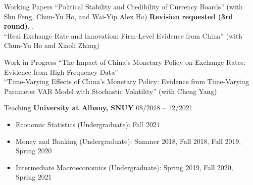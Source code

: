 \documentclass{resume_liang} %
\begin{document}
\begin{rSection}{Working Papers}
``Political Stability and Credibility of Currency Boards'' (with Shu Feng, Chun-Yu Ho, and Wai-Yip Alex Ho) \textbf{Revision requested (3rd round)}, \textit{}.
\vspace{0.1cm} \\
``Real Exchange Rate and Innovation: Firm-Level Evidence from China'' (with Chun-Yu Ho and Xiaoli Zhang) 
\vspace{0.1cm} \\
\end{rSection}
\bigskip  



\begin{rSection}{Work in Progress}
``The Impact of China's Monetary Policy on Exchange Rates: Evidence from High-Frequency Data''
\vspace{0.1cm}\\
``Time-Varying Effects of China's Monetary Policy: Evidence from Time-Varying Parameter VAR Model with Stochastic Volatility'' (with Cheng Yang)
\vspace{0.1cm}\\
\end{rSection}
\bigskip  



\newpage
\begin{rSection}{Teaching}
{\bf University at Albany, SNUY} \hfill { 08/2018 -- 12/2021 }
 \begin{itemize}
 	 \item[] Economic Statistics (Undergraduate): Fall 2021
     \item[] Money and Banking (Undergraduate): Summer 2018, Fall 2018, Fall 2019, Spring 2020
     \item[] Intermediate Macroeconomics (Undergraduate): Spring 2019, Fall 2020, Spring 2021
 \end{itemize} 
\vspace{0.3cm}
\end{rSection}
\bigskip  
\end{document}
